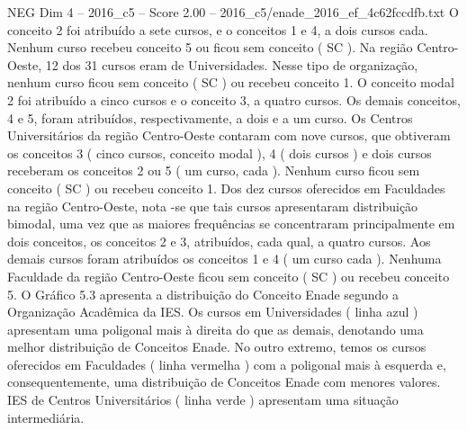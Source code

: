 \begin{textsample}{NEG Dim 4 – 2016\_c5 – Score 2.00 – 2016\_c5/enade\_2016\_ef\_4c62fccdfb.txt}
O conceito 2 foi atribuído a sete cursos, e o conceitos 1 e 4, a dois cursos cada.
Nenhum curso recebeu conceito 5 ou ficou sem conceito ( SC ).
Na região Centro-Oeste, 12 dos 31 cursos eram de Universidades.
Nesse tipo de organização, nenhum curso ficou sem conceito ( SC ) ou recebeu conceito 1.
O conceito modal 2 foi atribuído a cinco cursos e o conceito 3, a quatro cursos.
Os demais conceitos, 4 e 5, foram atribuídos, respectivamente, a dois e a um curso.
Os Centros Universitários da região Centro-Oeste contaram com nove cursos, que obtiveram os conceitos 3 ( cinco cursos, conceito modal ), 4 ( dois cursos ) e dois cursos receberam os conceitos 2 ou 5 ( um curso, cada ).
Nenhum curso ficou sem conceito ( SC ) ou recebeu conceito 1.
Dos dez cursos oferecidos em Faculdades na região Centro-Oeste, nota -se que tais cursos apresentaram distribuição bimodal, uma vez que as maiores frequências se concentraram principalmente em dois conceitos, os conceitos 2 e 3, atribuídos, cada qual, a quatro cursos.
Aos demais cursos foram atribuídos os conceitos 1 e 4 ( um curso cada ).
Nenhuma Faculdade da região Centro-Oeste ficou sem conceito ( SC ) ou recebeu conceito 5.
O Gráfico 5.3 apresenta a distribuição do Conceito Enade segundo a Organização Acadêmica da IES.
Os cursos em Universidades ( linha azul ) apresentam uma poligonal mais à direita do que as demais, denotando uma melhor distribuição de Conceitos Enade.
No outro extremo, temos os cursos oferecidos em Faculdades ( linha vermelha ) com a poligonal mais à esquerda e, consequentemente, uma distribuição de Conceitos Enade com menores valores.
IES de Centros Universitários ( linha verde ) apresentam uma situação intermediária.

\end{textsample}
